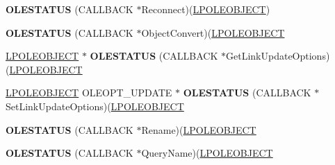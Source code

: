 \begin{DoxyCompactItemize}
\item 
\mbox{\label{struct___o_l_e_o_b_j_e_c_t_v_t_b_l_a1c510cee5ba89cf2b00012eb1dabaa75}} 
{\bfseries O\+L\+E\+S\+T\+A\+T\+US} (C\+A\+L\+L\+B\+A\+CK $\ast$Reconnect)(\hyperlink{struct___o_l_e_o_b_j_e_c_t}{L\+P\+O\+L\+E\+O\+B\+J\+E\+CT})
\item 
\mbox{\label{struct___o_l_e_o_b_j_e_c_t_v_t_b_l_a7a4e4c090db3fec0219007985b1ba36e}} 
{\bfseries O\+L\+E\+S\+T\+A\+T\+US} (C\+A\+L\+L\+B\+A\+CK $\ast$Object\+Convert)(\hyperlink{struct___o_l_e_o_b_j_e_c_t}{L\+P\+O\+L\+E\+O\+B\+J\+E\+CT}
\item 
\mbox{\label{struct___o_l_e_o_b_j_e_c_t_v_t_b_l_aa3cb47c5a55794f9eced9e9fd7496352}} 
\hyperlink{struct___o_l_e_o_b_j_e_c_t}{L\+P\+O\+L\+E\+O\+B\+J\+E\+CT} $\ast$ {\bfseries O\+L\+E\+S\+T\+A\+T\+US} (C\+A\+L\+L\+B\+A\+CK $\ast$Get\+Link\+Update\+Options)(\hyperlink{struct___o_l_e_o_b_j_e_c_t}{L\+P\+O\+L\+E\+O\+B\+J\+E\+CT}
\item 
\mbox{\label{struct___o_l_e_o_b_j_e_c_t_v_t_b_l_a7537ed48c5e8f333d6ff83bea8a8181a}} 
\hyperlink{struct___o_l_e_o_b_j_e_c_t}{L\+P\+O\+L\+E\+O\+B\+J\+E\+CT} O\+L\+E\+O\+P\+T\+\_\+\+U\+P\+D\+A\+TE $\ast$ {\bfseries O\+L\+E\+S\+T\+A\+T\+US} (C\+A\+L\+L\+B\+A\+CK $\ast$Set\+Link\+Update\+Options)(\hyperlink{struct___o_l_e_o_b_j_e_c_t}{L\+P\+O\+L\+E\+O\+B\+J\+E\+CT}
\item 
\mbox{\label{struct___o_l_e_o_b_j_e_c_t_v_t_b_l_a3a95961c99b46108d1a34c7f000ef3e6}} 
{\bfseries O\+L\+E\+S\+T\+A\+T\+US} (C\+A\+L\+L\+B\+A\+CK $\ast$Rename)(\hyperlink{struct___o_l_e_o_b_j_e_c_t}{L\+P\+O\+L\+E\+O\+B\+J\+E\+CT}
\item 
\mbox{\label{struct___o_l_e_o_b_j_e_c_t_v_t_b_l_a08e3c5460aa69438099945241d4dcb1c}} 
{\bfseries O\+L\+E\+S\+T\+A\+T\+US} (C\+A\+L\+L\+B\+A\+CK $\ast$Query\+Name)(\hyperlink{struct___o_l_e_o_b_j_e_c_t}{L\+P\+O\+L\+E\+O\+B\+J\+E\+CT}
\item 
\mbox{\label{struct___o_l_e_o_b_j_e_c_t_v_t_b_l_a7c1f4af21ec359ba49da5861e391ae0b}} 

\end{DoxyCompactItemize}
